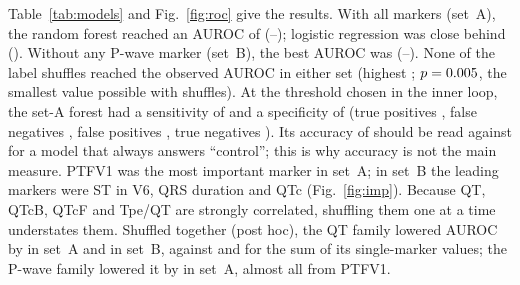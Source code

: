 \documentclass[conference]{IEEEtran}
\begin{document}
Table~\ref{tab:models} and Fig.~\ref{fig:roc} give the results. With all markers
(set~A), the random forest reached an AUROC of \nAucRfA{} (\nAucLoRfA--\nAucHiRfA);
logistic regression was close behind (\nAucLrA). Without any P-wave marker
(set~B), the best AUROC was \nAucRfB{} (\nAucLoRfB--\nAucHiRfB). None of the
\nNPerm{} label shuffles reached the observed AUROC in either set (highest
\nNullMax; $p=0.005$, the smallest value possible with \nNPerm{} shuffles). At
the threshold chosen in the inner loop, the set-A forest had a sensitivity of
\nSensRfA{} and a specificity of \nSpecRfA{} (true positives \nTp, false negatives
\nFn, false positives \nFp, true negatives \nTn). Its accuracy of \nAccRfA{}
should be read against \nAccMajA{} for a model that always answers ``control'';
this is why accuracy is not the main measure. PTFV1 was the most important
marker in set~A; in set~B the leading markers were ST in V6, QRS duration and QTc
(Fig.~\ref{fig:imp}). Because QT, QTcB, QTcF and Tpe/QT are strongly
correlated, shuffling them one at a time understates them. Shuffled together
(post hoc), the QT family lowered AUROC by \nGiQtA{} in set~A and \nGiQtB{} in
set~B, against \nGiQtSumA{} and \nGiQtSumB{} for the sum of its single-marker
values; the P-wave family lowered it by \nGiPA{} in set~A, almost all from
PTFV1.
\end{document}
